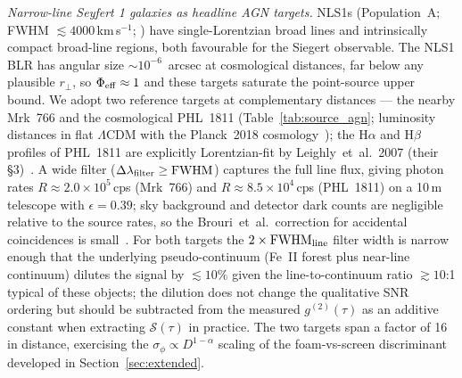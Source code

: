 \documentclass[aps,prd,onecolumn,amsmath,amssymb]{revtex4-2}
\begin{document}
\textit{Narrow-line Seyfert 1 galaxies as headline AGN targets.}
NLS1s (Population~A; FWHM $\lesssim 4000$\,km\,s$^{-1}$;
\cite{2002ApJ...566L..71S,2010MNRAS.403.1759Z}) have single-Lorentzian
broad lines and intrinsically compact broad-line regions, both
favourable for the Siegert observable.  The NLS1 BLR has angular size
$\sim 10^{-6}$~arcsec at cosmological distances, far below any
plausible $r_\perp$, so $\Phi_{\rm eff}\approx 1$ and these targets
saturate the point-source upper bound.
We adopt two reference targets at complementary distances --- the nearby
Mrk~766 and the cosmological PHL~1811 (Table~\ref{tab:source_agn};
luminosity distances in flat $\Lambda$CDM with the Planck~2018
cosmology~\cite{Aghanim2020}); the H$\alpha$ and H$\beta$ profiles of
PHL~1811 are explicitly Lorentzian-fit by Leighly~et~al.~2007 (their
\S3)~\cite{Leighly2007}.
A wide filter ($\Delta\lambda_{\rm filter} \geq \mathrm{FWHM}$) captures
the full line flux, giving photon rates $R \approx 2.0\times 10^5$\,cps
(Mrk~766) and $R \approx 8.5\times 10^4$\,cps (PHL~1811) on a 10\,m
telescope with $\epsilon = 0.39$; sky background and detector dark
counts are negligible relative to the source rates, so the Brouri~et~al.\
correction for accidental coincidences is small~\cite{Brouri2000}.
For both targets the $2\times \mathrm{FWHM}_{\rm line}$ filter width is
narrow enough that the underlying pseudo-continuum (Fe~II forest plus
near-line continuum) dilutes the signal by $\lesssim 10\%$ given
the line-to-continuum ratio $\gtrsim 10$:1 typical of these objects;
the dilution does not change the qualitative SNR ordering but should be
subtracted from the measured $g^{(2)}(\tau)$ as an additive constant
when extracting $\mathcal{S}(\tau)$ in practice.
The two targets span a factor of 16 in distance, exercising the
$\sigma_\phi \propto D^{1-\alpha}$ scaling of the foam-vs-screen
discriminant developed in Section~\ref{sec:extended}.
\end{document}
